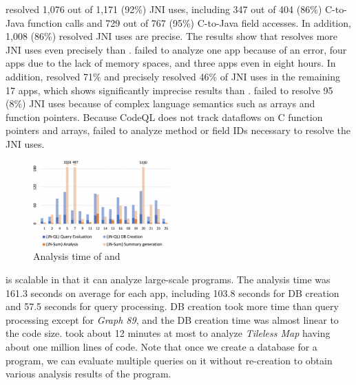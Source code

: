 \ours resolved 1,076 out of 1,171 (92\%) JNI uses, including 347 out of 404
(86\%) C-to-Java function calls and 729 out of 767 (95\%) C-to-Java field
accesses. In addition, 1,008 (86\%) resolved JNI uses are precise.
The results show that \ours resolves more JNI uses
even precisely than \lees. \lees failed to analyze one app
because of an error, four apps due to the lack of memory spaces,
and three apps even in eight hours.  In addition, \lees resolved
71\% and precisely resolved 46\% of JNI uses in the remaining 17
apps, which shows significantly imprecise results than \ours.
%
\ours failed to resolve 95 (8\%) JNI uses because of complex
language semantics such as arrays and function pointers.  Because CodeQL does
not track dataflows on C function pointers and arrays, \ours failed to analyze
method or field IDs necessary to resolve the JNI uses.




\begin{figure}[t]
  \centering
  \vspace{2mm}
  \includegraphics[width=0.47\textwidth]{img/graph}
  \vspace*{-.5em}
  \caption{Analysis time of \ours and \lees}
  \label{fig:graph}
\vspace*{-1em}
\end{figure}

\ours is scalable in that it can analyze large-scale programs. The analysis
time was 161.3 seconds on average for each app, including 103.8 seconds for DB
creation and 57.5 seconds for query processing.  DB creation took more time
than query processing except for {\it Graph 89}, and the DB creation time was
almost linear to the code size. \ours took about 12 minutes at most to analyze
{\it Tileless Map} having about one million lines of code.
Note that once we create a database
for a program, we can evaluate multiple queries on it without
re-creation to obtain various analysis results of the program.


